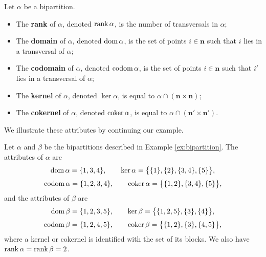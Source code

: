 \begin{definition}
  Let $\alpha$ be a bipartition.
  \begin{itemize}
  \item The \textbf{rank} of $\alpha$, denoted $\operatorname{rank} \alpha$, is the number of
    transversals in $\alpha$;
  \item The \textbf{domain} of $\alpha$, denoted $\operatorname{dom} \alpha$, is the set of
    points $i \in \mathbf{n}$ such that $i$ lies in a transversal of $\alpha$;
  \item The \textbf{codomain} of $\alpha$, denoted $\operatorname{codom} \alpha$, is the set
    of points $i \in \mathbf{n}$ such that $i'$ lies in a transversal of
    $\alpha$;
  \item The \textbf{kernel} of $\alpha$, denoted $\ker \alpha$, is equal to
    $\alpha \cap (\mathbf{n} \times \mathbf{n})$;
  \item The \textbf{cokernel} of $\alpha$, denoted $\operatorname{coker} \alpha$, is equal to
    $\alpha \cap (\mathbf{n}' \times \mathbf{n}')$.
  \end{itemize}
\end{definition}

We illustrate these attributes by continuing our example.

\begin{example}
  \label{ex:codomain}
  Let $\alpha$ and $\beta$ be the bipartitions described in Example
  \ref{ex:bipartition}.  The attributes of $\alpha$ are
  $$\operatorname{dom} \alpha = \{1,3,4\}, \qquad
  \ker \alpha = \big\{\{1\}, \{2\}, \{3,4\}, \{5\}\big\},$$
  $$\operatorname{codom} \alpha = \{1,2,3,4\}, \qquad
  \operatorname{coker} \alpha = \big\{\{1, 2\}, \{3,4\}, \{5\}\big\},$$
  and the attributes of $\beta$ are
  $$\operatorname{dom} \beta = \{1,2,3,5\}, \qquad
  \ker \beta = \big\{\{1,2,5\}, \{3\}, \{4\}\big\},$$
  $$\operatorname{codom} \beta = \{1,2,4,5\}, \qquad
  \operatorname{coker} \beta = \big\{\{1,2\}, \{3\}, \{4,5\}\big\},$$
  where a kernel or cokernel is identified with the set of its blocks.
  We also have $\operatorname{rank} \alpha = \operatorname{rank} \beta = 2$.
\end{example}

